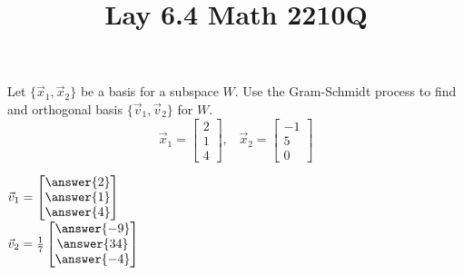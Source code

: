 \documentclass{ximera}
\begin{document}
  	\title{Lay 6.4  \hfill Math 2210Q} 
  	  		    \begin{question} 
  	  		    	Let $\{\vec{x}_1, \vec{x}_2\}$ be a basis for a subspace $W$. Use the Gram-Schmidt process to find and orthogonal basis $\{\vec{v}_1,\vec{v}_2\}$ for $W$.
  	  		    $$\vec{x}_1 = \begin{bmatrix} 2\\1\\4\end{bmatrix}, \hspace{10pt} \vec{x}_2 = \begin{bmatrix} -1\\5\\0\end{bmatrix}$$
  	  		    
  	  		    $\vec{v}_1 = \begin{bmatrix} \answer{2}\\\answer{1}\\\answer{4}\end{bmatrix}$\vspace{10pt}\\
  	  		    $\vec{v}_2 = \frac{1}{7}\begin{bmatrix} \answer{-9}\\\answer{34}\\\answer{-4}\end{bmatrix}$\vspace{10pt}\\
  	  		    
  	  		    	\end{question}
  	  		    	 	
\end{document}
